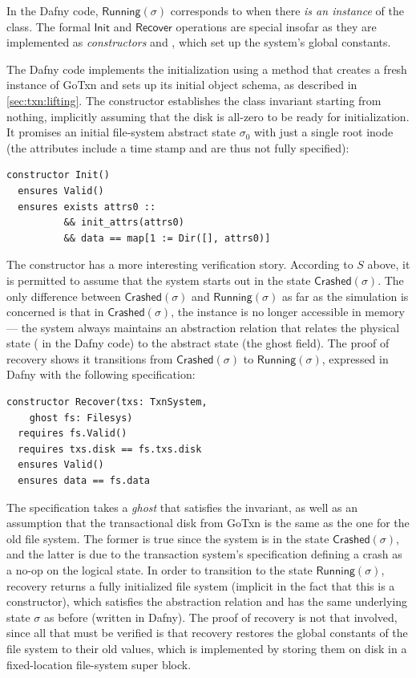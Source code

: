 In the Dafny code, $\mathsf{Running}(\sigma)$ corresponds to when there \emph{is
an instance} of the  class. The formal $\mathsf{Init}$ and
$\mathsf{Recover}$ operations are special insofar as they are implemented as
\emph{constructors}  and , which set up the system's global
constants.

The Dafny code implements the initialization using a  method
that creates a fresh instance of GoTxn and sets up its initial object schema, as
described in \cref{sec:txn:lifting}. The  constructor establishes the
class invariant  starting from nothing, implicitly assuming that the
disk is all-zero to be ready for initialization. It promises an initial
file-system abstract state $\sigma_{0}$ with just a single root inode (the
attributes include a time stamp and are thus not fully specified):

\begin{verbatim}
constructor Init()
  ensures Valid()
  ensures exists attrs0 ::
          && init_attrs(attrs0)
          && data == map[1 := Dir([], attrs0)]
\end{verbatim}

The  constructor has a more interesting verification story.
According to $S$ above,
it is permitted to assume that the system starts out in the state
$\mathsf{Crashed}(\sigma)$. The only difference between
$\mathsf{Crashed}(\sigma)$ and $\mathsf{Running}(\sigma)$ as far as the
simulation is concerned is that in $\mathsf{Crashed}(\sigma)$, the 
instance is no longer accessible in memory --- the system always maintains an
abstraction relation  that relates the physical state
( in the Dafny code) to the abstract state (the  ghost
field). The proof of recovery shows it transitions from
$\mathsf{Crashed}(\sigma)$ to $\mathsf{Running}(\sigma)$, expressed in Dafny
with the following specification:

\begin{verbatim}
constructor Recover(txs: TxnSystem,
    ghost fs: Filesys)
  requires fs.Valid()
  requires txs.disk == fs.txs.disk
  ensures Valid()
  ensures data == fs.data
\end{verbatim}

The specification takes a \emph{ghost}  that satisfies the invariant, as
well as an assumption that the transactional disk from GoTxn is the same as the
one for the old file system. The former is true since the system is in the state
$\mathsf{Crashed}(\sigma)$, and the latter is due to the transaction system's
specification defining a crash as a no-op on the logical state. In order to
transition to the state $\mathsf{Running}(\sigma)$, recovery returns a fully
initialized file system (implicit in the fact that this is a constructor), which
satisfies the abstraction relation  and has the same underlying
state $\sigma$ as before (written  in Dafny). The proof of
recovery is not that involved, since all that must be verified is that recovery
restores the global constants of the file system to their old values, which is
implemented by storing them on disk in a fixed-location file-system super block.

